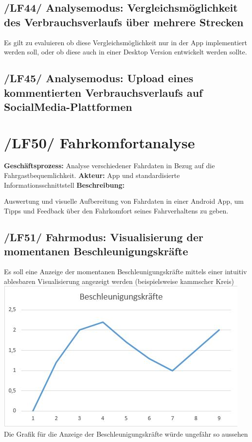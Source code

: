 \subsection{/LF44/ Analysemodus: Vergleichsmöglichkeit des Verbrauchsverlaufs über mehrere Strecken}
\nextline
Es gilt zu evaluieren ob diese Vergleichsmöglichkeit nur in der App implementiert werden soll, oder ob diese auch in einer Desktop Version entwickelt werden sollte.

\subsection{/LF45/ Analysemodus: Upload eines kommentierten Verbrauchsverlaufs auf SocialMedia-Plattformen }

\newpage

\section{/LF50/ Fahrkomfortanalyse}
\textbf{Geschäftsprozess:}	Analyse verschiedener Fahrdaten in Bezug auf die Fahrgastbequemlichkeit.
\textbf{Akteur:}			App und standardisierte Informationsschnittstell
\textbf{Beschreibung:}	

Auswertung und visuelle Aufbereitung von Fahrdaten in einer Android App, um Tipps und Feedback über den Fahrkomfort seines Fahrverhaltens zu geben.

\subsection{/LF51/ Fahrmodus: Visualisierung der momentanen Beschleunigungskräfte}
\nextline
Es soll eine Anzeige der momentanen Beschleunigungskräfte mittels einer intuitiv ablesbaren Visualisierung angezeigt werden (beispielsweise kammscher Kreis)
\nextline
\includegraphics{images/LF51_Beschleunigung.jpg}
\nextline
Die Grafik für die Anzeige der Beschleunigungskräfte würde ungefähr so aussehen


